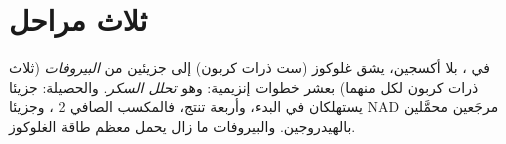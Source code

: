 \section{ثلاث مراحل}

\begin{proposition}\label{prop:g12:respiration-fermentation:glycolysis}
في ، بلا أكسجين، يشق غلوكوز (ست ذرات كربون) إلى جزيئين من
\emph{البيروفات} (ثلاث ذرات كربون لكل منهما) بعشر خطوات إنزيمية: وهو
\emph{تحلل السكر}. والحصيلة: جزيئا  يستهلكان في
البدء، وأربعة تنتج، فالمكسب الصافي 2 ، وجزيئا NAD مرجَعين محمَّلين
بالهيدروجين. والبيروفات ما زال يحمل معظم طاقة الغلوكوز.
\end{proposition}
\admitted

